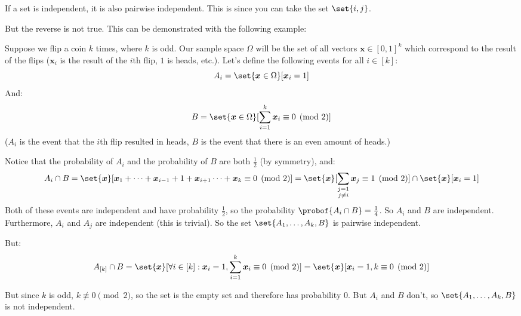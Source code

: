 \begin{note}

	If a set is independent, it is also pairwise independent.
	This is since you can take the set $\set{i,j}$.

	But the reverse is not true.
	This can be demonstrated with the following example:

	\def\bx{\boldsymbol x}
	Suppose we flip a coin $k$ times, where $k$ is odd.
	Our sample space $\Omega$ will be the set of all vectors $\bx\in[0,1]^k$ which
	correspond to the result of the flips ($\bx_i$ is the result of the $i$th flip, $1$ is heads, etc.).
	Let's define the following events for all $i\in[k]$:
	\[ A_i = \set{\bx\in\Omega}[\bx_i=1] \]
	And:
	\[ B = \set{\bx\in\Omega}[\sum_{i=1}^k\bx_i\equiv 0\pmod{2}] \]
	($A_i$ is the event that the $i$th flip resulted in heads, $B$ is the event that there is an even amount of heads.)


	Notice that the probability of $A_i$ and the probability of $B$ are both $\frac12$ (by symmetry), and:
	\[ A_i\cap B = \set{\bx}[\bx_1+\cdots+\bx_{i-1}+1+\bx_{i+1}\cdots+\bx_k\equiv0\pmod{2}] =
	   \set{\bx}[\sum_{\substack{j=1\\j\neq i}}\bx_j\equiv1\pmod{2}]\cap\set{\bx}[\bx_i=1] \]
	Both of these events are independent and have probability $\frac12$, so the probability $\probof{A_i\cap B}=\frac14$.
	So $A_i$ and $B$ are independent.
	Furthermore, $A_i$ and $A_j$ are independent (this is trivial).
	So the set $\set{A_1,\dots,A_k,B}$ is pairwise independent.

	But:
	\[ A_{[k]}\cap B = \set{\bx}[\forall i\in{[k]}: \bx_i=1, \sum_{i=1}^k\bx_i\equiv0\pmod2] =
	   \set{\bx}[\bx_i=1, k\equiv0\pmod2] \]

	But since $k$ is odd, $k\not\equiv0\pmod2$, so the set is the empty set and therefore has probability $0$.
	But $A_i$ and $B$ don't, so $\set{A_1,\dots,A_k,B}$ is not independent.

\end{note}

